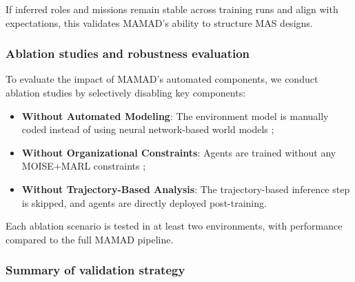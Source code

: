 \documentclass[pdflatex,sn-mathphys-num]{sn-jnl}%
\theoremstyle{thmstyleone}%
\theoremstyle{thmstyletwo}%
\theoremstyle{thmstylethree}%
\begin{document}
If inferred roles and missions remain stable across training runs and align with expectations, this validates MAMAD's ability to structure MAS designs.

\subsubsection{Ablation studies and robustness evaluation}
To evaluate the impact of MAMAD's automated components, we conduct ablation studies by selectively disabling key components:
\begin{itemize}
    \item \textbf{Without Automated Modeling}: The environment model is manually coded instead of using neural network-based world models ;
    \item \textbf{Without Organizational Constraints}: Agents are trained without any MOISE+MARL constraints ;
    \item \textbf{Without Trajectory-Based Analysis}: The trajectory-based inference step is skipped, and agents are directly deployed post-training.
\end{itemize}

Each ablation scenario is tested in at least two environments, with performance compared to the full MAMAD pipeline.


\subsubsection{Summary of validation strategy}

\end{document}
